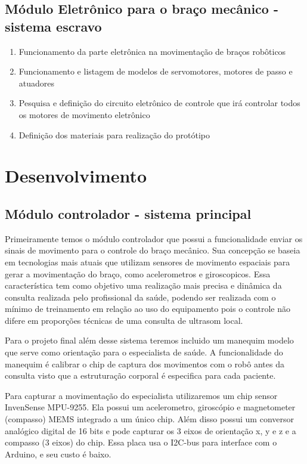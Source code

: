 \documentclass[a4paper]{article}
\begin{document}
\subsection{Módulo Eletrônico para o braço mecânico - sistema escravo}

\begin{enumerate}
\item Funcionamento da parte eletrônica na movimentação de braços robôticos
\item Funcionamento e listagem de modelos de servomotores, motores de passo e atuadores
\item Pesquisa e definição do circuito eletrônico de controle que irá controlar todos os motores de movimento eletrônico
\item Definição dos materiais para realização do protótipo
\end{enumerate}


\section{Desenvolvimento}

\subsection{Módulo controlador - sistema principal}

Primeiramente temos o módulo controlador que possui a funcionalidade enviar os sinais de movimento para o controle do braço mecânico. Sua concepção se baseia em tecnologias mais atuais que utilizam  sensores de movimento espaciais para gerar a movimentação do braço, como acelerometros e giroscopicos. Essa característica tem como objetivo uma realização mais precisa e dinâmica da consulta realizada pelo profissional da saúde, podendo ser realizada com o mínimo de treinamento em relação ao uso do equipamento pois o controle não difere em proporções técnicas de uma consulta de ultrasom local. 

Para o projeto final além desse sistema teremos incluido um manequim modelo que serve como orientação para o especialista de saúde. A funcionalidade do manequim é calibrar o chip de captura dos movimentos com o robô antes da consulta visto que a estruturação corporal é especifica para cada paciente. 

Para capturar a movimentação do especialista utilizaremos um chip sensor InvenSense MPU-9255. Ela possui um acelerometro, giroscópio e magnetometer (compasso) MEMS integrado a um único chip. Além disso possui um conversor analógico digital de 16 bits e pode capturar os 3 eixos de orientação x, y e z e a compasso (3 eixos) do chip. Essa placa usa o I2C-bus para interface com o Arduino, e seu custo é baixo.
\end{document}
